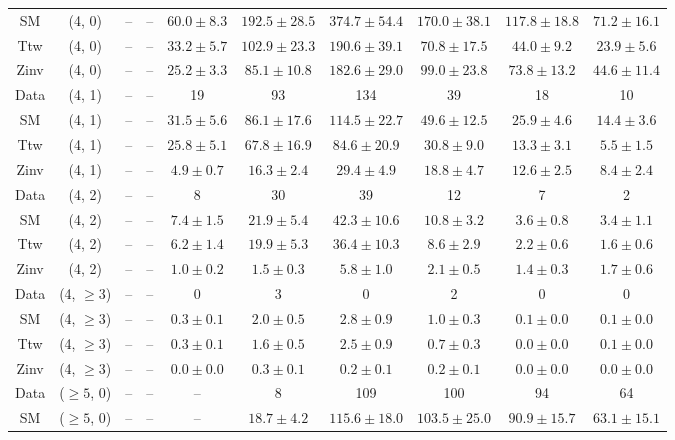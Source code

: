 \begin{table}[h!]
{\begin{tabular}{cccccccccc}
	SM & (4, 0) & -- & -- & $60.0\pm 8.3$ & $192.5\pm 28.5$ & $374.7\pm 54.4$ & $170.0\pm 38.1$ & $117.8\pm 18.8$ & $71.2\pm 16.1$ \\[0.5ex] 
	Ttw & (4, 0) & -- & -- & $33.2\pm 5.7$ & $102.9\pm 23.3$ & $190.6\pm 39.1$ & $70.8\pm 17.5$ & $44.0\pm 9.2$ & $23.9\pm 5.6$ \\[0.5ex] 
	Zinv & (4, 0) & -- & -- & $25.2\pm 3.3$ & $85.1\pm 10.8$ & $182.6\pm 29.0$ & $99.0\pm 23.8$ & $73.8\pm 13.2$ & $44.6\pm 11.4$ \\[0.5ex] 
	Data & (4, 1) & -- & -- & 19 & 93 & 134 & 39 & 18 & 10 \\[0.5ex] 
	SM & (4, 1) & -- & -- & $31.5\pm 5.6$ & $86.1\pm 17.6$ & $114.5\pm 22.7$ & $49.6\pm 12.5$ & $25.9\pm 4.6$ & $14.4\pm 3.6$ \\[0.5ex] 
	Ttw & (4, 1) & -- & -- & $25.8\pm 5.1$ & $67.8\pm 16.9$ & $84.6\pm 20.9$ & $30.8\pm 9.0$ & $13.3\pm 3.1$ & $5.5\pm 1.5$ \\[0.5ex] 
	Zinv & (4, 1) & -- & -- & $4.9\pm 0.7$ & $16.3\pm 2.4$ & $29.4\pm 4.9$ & $18.8\pm 4.7$ & $12.6\pm 2.5$ & $8.4\pm 2.4$ \\[0.5ex] 
	Data & (4, 2) & -- & -- & 8 & 30 & 39 & 12 & 7 & 2 \\[0.5ex] 
	SM & (4, 2) & -- & -- & $7.4\pm 1.5$ & $21.9\pm 5.4$ & $42.3\pm 10.6$ & $10.8\pm 3.2$ & $3.6\pm 0.8$ & $3.4\pm 1.1$ \\[0.5ex] 
	Ttw & (4, 2) & -- & -- & $6.2\pm 1.4$ & $19.9\pm 5.3$ & $36.4\pm 10.3$ & $8.6\pm 2.9$ & $2.2\pm 0.6$ & $1.6\pm 0.6$ \\[0.5ex] 
	Zinv & (4, 2) & -- & -- & $1.0\pm 0.2$ & $1.5\pm 0.3$ & $5.8\pm 1.0$ & $2.1\pm 0.5$ & $1.4\pm 0.3$ & $1.7\pm 0.6$ \\[0.5ex] 
	Data & (4, $\ge3$) & -- & -- & 0 & 3 & 0 & 2 & 0 & 0 \\[0.5ex] 
	SM & (4, $\ge3$) & -- & -- & $0.3\pm 0.1$ & $2.0\pm 0.5$ & $2.8\pm 0.9$ & $1.0\pm 0.3$ & $0.1\pm 0.0$ & $0.1\pm 0.0$ \\[0.5ex] 
	Ttw & (4, $\ge3$) & -- & -- & $0.3\pm 0.1$ & $1.6\pm 0.5$ & $2.5\pm 0.9$ & $0.7\pm 0.3$ & $0.0\pm 0.0$ & $0.1\pm 0.0$ \\[0.5ex] 
	Zinv & (4, $\ge3$) & -- & -- & $0.0\pm 0.0$ & $0.3\pm 0.1$ & $0.2\pm 0.1$ & $0.2\pm 0.1$ & $0.0\pm 0.0$ & $0.0\pm 0.0$ \\[0.5ex] 
	Data & ($\ge5$, 0) & -- & -- & -- & 8 & 109 & 100 & 94 & 64 \\[0.5ex] 
	SM & ($\ge5$, 0) & -- & -- & -- & $18.7\pm 4.2$ & $115.6\pm 18.0$ & $103.5\pm 25.0$ & $90.9\pm 15.7$ & $63.1\pm 15.1$ \\[0.5ex] 

\end{tabular}}
\end{table}
